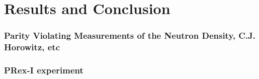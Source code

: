 \chapter{Results and Conclusion}


\subsection{ Parity Violating Measurements of the Neutron Density, C.J. Horowitz, etc}
\subsection{PRex-I experiment}
